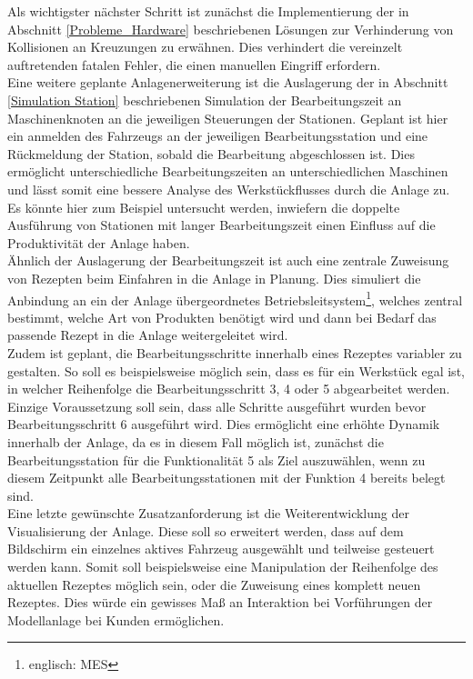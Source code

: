 	Als wichtigster nächster Schritt ist zunächst die Implementierung der in Abschnitt \ref{Probleme_Hardware} beschriebenen Lösungen zur Verhinderung von Kollisionen an Kreuzungen zu erwähnen. Dies verhindert die vereinzelt auftretenden fatalen Fehler, die einen manuellen Eingriff erfordern.\\
	Eine weitere  geplante Anlagenerweiterung ist die Auslagerung der in Abschnitt \ref{Simulation Station} beschriebenen Simulation der Bearbeitungszeit an Maschinenknoten an die jeweiligen Steuerungen der Stationen. Geplant ist hier ein anmelden des Fahrzeugs an der jeweiligen Bearbeitungsstation und eine Rückmeldung der Station, sobald die Bearbeitung abgeschlossen ist. Dies ermöglicht unterschiedliche Bearbeitungszeiten an unterschiedlichen Maschinen und lässt somit eine bessere Analyse des Werkstückflusses durch die Anlage zu. Es könnte hier zum Beispiel untersucht werden, inwiefern die doppelte Ausführung von Stationen mit langer Bearbeitungszeit einen Einfluss auf die Produktivität der Anlage haben.
	\\[4pt]
	Ähnlich der Auslagerung der Bearbeitungszeit ist auch eine zentrale Zuweisung von Rezepten beim Einfahren in die Anlage in Planung. Dies simuliert die Anbindung an ein der Anlage übergeordnetes Betriebsleitsystem\footnote{englisch: \ac{MES}}, welches zentral bestimmt, welche Art von Produkten benötigt wird und dann bei Bedarf das passende Rezept in die Anlage weitergeleitet wird.
	\\[4pt]
	Zudem ist geplant, die Bearbeitungsschritte innerhalb eines Rezeptes variabler zu gestalten. So soll es beispielsweise möglich sein, dass es für ein Werkstück egal ist, in welcher Reihenfolge die  Bearbeitungsschritt 3, 4 oder 5 abgearbeitet werden. Einzige Voraussetzung soll sein, dass alle Schritte ausgeführt wurden bevor Bearbeitungsschritt 6 ausgeführt wird. Dies ermöglicht eine erhöhte Dynamik innerhalb der Anlage, da es in diesem Fall möglich ist, zunächst die Bearbeitungsstation für die Funktionalität 5 als Ziel auszuwählen, wenn zu diesem Zeitpunkt alle Bearbeitungsstationen mit der Funktion 4 bereits belegt sind.
	\\[4pt]
	Eine letzte gewünschte Zusatzanforderung ist die Weiterentwicklung der Visualisierung der Anlage. Diese soll so erweitert werden, dass auf dem Bildschirm ein einzelnes aktives Fahrzeug ausgewählt und teilweise gesteuert werden kann. Somit soll beispielsweise eine Manipulation der Reihenfolge des aktuellen Rezeptes möglich sein, oder die Zuweisung eines komplett neuen Rezeptes. Dies würde ein gewisses Maß an Interaktion bei Vorführungen der Modellanlage bei Kunden ermöglichen.

